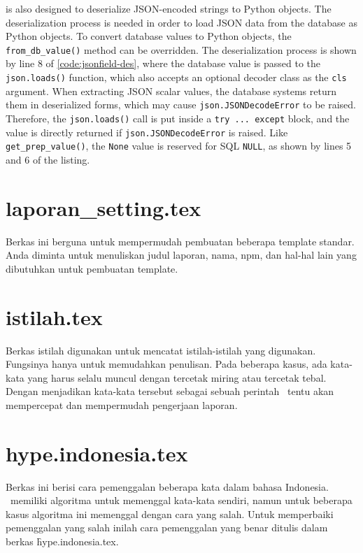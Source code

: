  is also designed to deserialize JSON-encoded strings to Python
objects. The deserialization process is needed in order to load JSON data from
the database as Python objects. To convert database values to Python objects,
the \verb|from_db_value()| method can be overridden. The deserialization
process is shown by line 8 of \autoref{code:jsonfield-des}, where the database
value is passed to the \verb|json.loads()| function, which also accepts an
optional decoder class as the \verb|cls| argument. When extracting JSON scalar
values, the database systems return them in deserialized forms, which may cause
\verb|json.JSONDecodeError| to be raised. Therefore, the \verb|json.loads()|
call is put inside a \verb|try ... except| block, and the value is directly
returned if \verb|json.JSONDecodeError| is raised. Like
\verb|get_prep_value()|, the \verb|None| value is reserved for SQL \verb|NULL|,
as shown by lines 5 and 6 of the listing.



\section{laporan\_setting.tex}
Berkas ini berguna untuk mempermudah pembuatan beberapa template standar.
Anda diminta untuk menuliskan judul laporan, nama, npm, dan hal-hal lain yang dibutuhkan untuk pembuatan template.


\section{istilah.tex}
Berkas istilah digunakan untuk mencatat istilah-istilah yang digunakan.
Fungsinya hanya untuk memudahkan penulisan.
Pada beberapa kasus, ada kata-kata yang harus selalu muncul dengan tercetak miring atau tercetak tebal.
Dengan menjadikan kata-kata tersebut sebagai sebuah perintah \latex~tentu akan mempercepat dan mempermudah pengerjaan laporan.


\section{hype.indonesia.tex}
Berkas ini berisi cara pemenggalan beberapa kata dalam bahasa Indonesia.
\latex~memiliki algoritma untuk memenggal kata-kata sendiri, namun untuk beberapa kasus algoritma ini memenggal dengan cara yang salah.
Untuk memperbaiki pemenggalan yang salah inilah cara pemenggalan yang benar ditulis dalam berkas \f{hype.indonesia.tex}.


